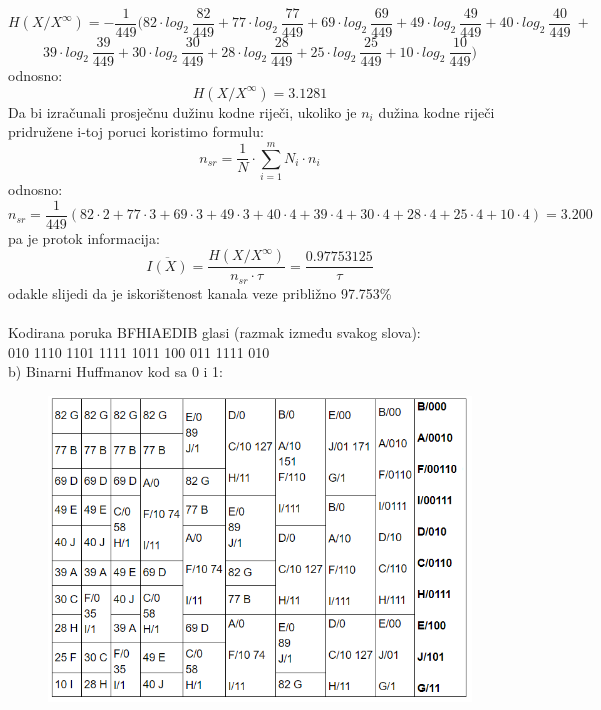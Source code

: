\documentclass[12pt]{article}
\begin{document}
\begin{enumerate}
\begin{equation*}
    H(X/X^\infty) = - \frac{1}{449}(82 \cdot log_2~\frac{82}{449} +	77 \cdot log_2~\frac{77}{449} +
    69 \cdot log_2~\frac{69}{449} + 49 \cdot log_2~\frac{49}{449} + 40 \cdot log_2~\frac{40}{449}~+
\end{equation*}
\begin{equation*}
	39 \cdot log_2~\frac{39}{449} + 30 \cdot log_2~\frac{30}{449} + 28 \cdot log_2~\frac{28}{449} +
	25 \cdot log_2~\frac{25}{449} + 10 \cdot log_2~\frac{10}{449})
\end{equation*}
odnosno:
\begin{equation*}
    H(X/X^\infty) = 3.1281
\end{equation*}
Da bi izračunali prosječnu dužinu kodne riječi, ukoliko je $n_i$ dužina
kodne riječi pridružene i-toj poruci koristimo formulu:
\begin{equation*}
    n_{sr} = \frac{1}{N} \cdot \sum_{i = 1}^m N_i \cdot n_i
\end{equation*}
odnosno:
\begin{equation*}
    n_{sr} = \frac{1}{449}(82 \cdot 2 + 77 \cdot 3 + 69 \cdot 3 + 49 \cdot 3 + 40 \cdot 4 + 39 \cdot 4 + 30 \cdot 4 + 28 \cdot 4 + 25 \cdot 4 + 10 \cdot 4) = 3.200
\end{equation*}
pa je protok informacija:
\begin{equation*}
    \overline{I(X)} = \frac{H(X/X^\infty)}{n_{sr} \cdot \tau} = \frac{0.97753125}{\tau}
\end{equation*}
odakle slijedi da je iskorištenost kanala veze približno 97.753\% \\
\\
Kodirana poruka BFHIAEDIB glasi (razmak između svakog slova): \\
010 1110 1101 1111 1011 100 011 1111 010
\vspace{0.5cm}	
\\
b) Binarni Huffmanov kod sa 0 i 1: \\

\begin{figure}[htp]
    \centering
    \includegraphics[width=15cm]{5b.png}
\end{figure}



\end{enumerate}
\end{document}
